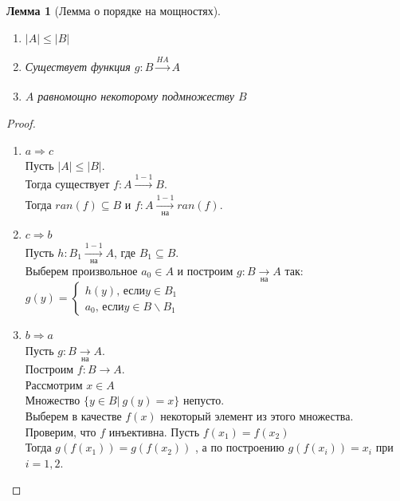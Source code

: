 \documentclass[a4paper]{article}
\newtheorem*{lemma*}{Лемма}
\theoremstyle{definition}
\begin{document}
\begin{enumerate}
\begin{lemma*}[Лемма о порядке на мощностях]
\begin{enumerate}
         \item $\left | A \right | \leq \left | B \right |$
         \item Существует функция $g : B\xrightarrow[]{HA}A$
         \item $A$ равномощно некоторому подмножеству $B$
        \end{enumerate}
       \end{lemma*}
       \begin{proof}
        \mbox{}\\
        \begin{enumerate}
         \item $a \Rightarrow c$ \\
               Пусть $\left | A \right | \leq \left | B \right |$.\\
               Тогда существует $f : A \xrightarrow[]{1-1} B$. \\
               Тогда $ran(f) \subseteq B$ и $f : A\xrightarrow[\textit{на}]{1-1}ran(f)$.\\
         \item $c \Rightarrow b$ \\
               Пусть $h : B_{1}\xrightarrow[\text{на}]{1-1}A$, где $B_{1}\subseteq B$. \\
               Выберем произвольное $a_{0} \in A$ и построим $g : B\xrightarrow[\text{на}]{}A$ так:
               $g(y) = \left\{\begin{matrix}
                 h(y)\text{, если} y \in B_{1} \\
                 a_{0}\text{, если}y \in B\backslash B_{1}
                \end{matrix}\right.$
         \item $b \Rightarrow a$ \\
               Пусть $g : B\xrightarrow[\text{на}]{ }A$.\\
               Построим $f : B\rightarrow A$.\\
               Рассмотрим $x\in A$\\
               Множество $\{y\in B |\ g(y) = x\}$ непусто.\\
               Выберем в качестве $f(x)$ некоторый элемент из этого множества. Проверим, что $f$ инъективна. Пусть $f(x_{1}) = f(x_{2})$\\
               Тогда $g(f(x_{1})) = g(f(x_{2}))$ , а по построению $g(f(x_{i})) = x_{i}$ при $i = 1,2.$
        \end{enumerate}
       \end{proof}

\end{enumerate}
\end{document}
